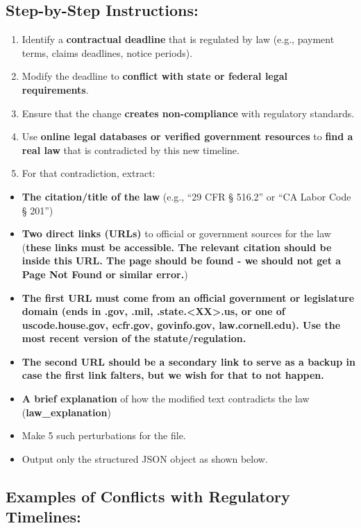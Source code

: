 \documentclass[11pt]{article}
\begin{document}
\begin{tcolorbox}[breakable,colback=lightestgray,colframe=black,title=\textbf{Inconsistency Legal Data Generation Prompt}]
\subsection*{\textbf{Step-by-Step Instructions:}}
\begin{enumerate}
    \item Identify a \textbf{contractual deadline} that is regulated by law (e.g., payment terms, claims deadlines, notice periods).
    \item Modify the deadline to \textbf{conflict with state or federal legal requirements}.
    \item Ensure that the change \textbf{creates non-compliance} with regulatory standards.
    \item Use \textbf{online legal databases or verified government resources} to \textbf{find a real law} that is contradicted by this new timeline.
    \item For that contradiction, extract:
\end{enumerate}
\begin{itemize}
    \item \textbf{The citation/title of the law} (e.g., ``29 CFR § 516.2'' or ``CA Labor Code § 201'')
    \item \textbf{Two direct links (URLs)} to official or government sources for the law (\textbf{these links must be accessible. The relevant citation should be inside this URL. The page should be found - we should not get a Page Not Found or similar error.})
    \item \textbf{The first URL must come from an official government or legislature domain (ends in .gov, .mil, .state.<XX>.us, or one of uscode.house.gov, ecfr.gov, govinfo.gov, law.cornell.edu). Use the most recent version of the statute/regulation.}
    \item \textbf{The second URL should be a secondary link to serve as a backup in case the first link falters, but we wish for that to not happen.}
    \item \textbf{A brief explanation} of how the modified text contradicts the law (\textbf{law\_explanation})
    \item Make 5 such perturbations for the file.
    \item Output only the structured JSON object as shown below.
	\end{itemize}

\subsection*{\textbf{Examples of Conflicts with Regulatory Timelines:}}


\end{tcolorbox}
\end{document}
